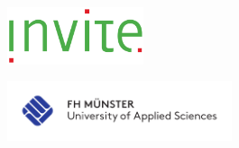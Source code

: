 \thispagestyle{empty}
\vspace*{-2cm} %
\setlength{\unitlength}{1cm}
\hfill
\begin{minipage}[t]{4cm} 
	\begin{center}
	   \includegraphics[width=40mm]{bilder/Firmenlogo.png}
	\end{center}
 \end{minipage}
 \hfill  %
 \begin{minipage}[t]{7cm}
	\begin{flushright}
	   \includegraphics[width=66mm]{bilder/fhm_Logo_CMYK_30mm.pdf}
	\end{flushright}
 \end{minipage}

